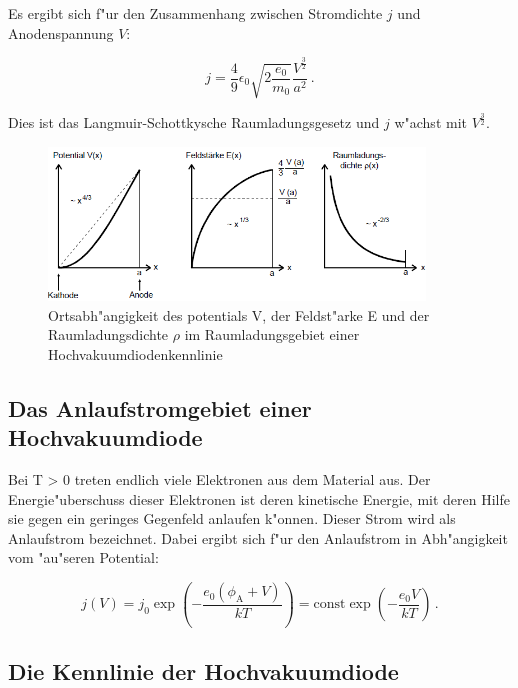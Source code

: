Es ergibt sich f"ur den Zusammenhang zwischen Stromdichte $j$ und Anodenspannung $V$:

\begin{equation}
	j = \frac{4}{9} \epsilon_\mathrm{0} \sqrt{2 \frac{e_\mathrm{0}}{m_\mathrm{0}}} \frac{V^\frac{3}{2}}{a^2} \, .
\end{equation}

Dies ist das Langmuir-Schottkysche Raumladungsgesetz und $j$ w"achst mit $V^\frac{3}{2}$.

\begin{figure}[!h]
	\centering
	\includegraphics[width = 10cm]{img/schott.PNG}
	\caption{Ortsabh"angigkeit des potentials V, der Feldst"arke E und der Raumladungsdichte $\rho$ im Raumladungsgebiet einer Hochvakuumdiodenkennlinie}
	\label{schott}
\end{figure}

\subsection{Das Anlaufstromgebiet einer Hochvakuumdiode} %
\label{sub:das_anlaufstromgebiet_einer_hochvakuumdiode}

Bei T > 0 treten endlich viele Elektronen aus dem Material aus. Der Energie"uberschuss dieser Elektronen ist deren kinetische Energie, mit deren Hilfe sie gegen ein geringes Gegenfeld anlaufen k"onnen.
Dieser Strom wird als Anlaufstrom bezeichnet.
Dabei ergibt sich f"ur den Anlaufstrom in Abh"angigkeit vom "au"seren Potential:

\begin{equation}
	j(V) = j_\mathrm{0} \exp{ \left( -\frac{e_\mathrm{0} (\phi_\mathrm{A} + V)}{kT} \right)} = \mathrm{const} \exp{ \left( -\frac{e_\mathrm{0}V}{kT} \right)}\, .
\end{equation}

\subsection{Die Kennlinie der Hochvakuumdiode} %
\label{sub:die_kennlinie_der_hochvakuumdiode}

